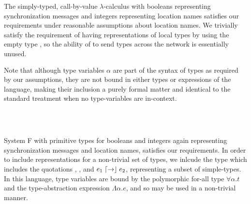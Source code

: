 \begin{ex}
  \label{ex:st-lambda}
  The simply-typed, call-by-value $\lambda$-calculus with booleans representing synchronization messages and integers representing location names satisfies our requirements under reasonable assumptions about location names.
  We trivially satisfy the requirement of having representations of local types by using the empty type \Empty, so the ability of \langname to send types across the network is essentially unused.

  Note that although type variables $\alpha$ are part of the syntax of types as required by our assumptions, they are not bound in either types or expressions of the language, making their inclusion a purely formal matter and identical to the standard treatment when no type-variables are in-context.
  \begin{syntax}
  	 \alternative{\alpha} \alternative{\Int} \alternative{\Bool} \alternative{\Empty} 
       \\
     \\
    \alternative{\True} \alternative{\False} 
  \end{syntax}
\end{ex}

\begin{ex}[System F]
  \label{ex:system-f}
  System F with primitive types for booleans and integers again representing synchronization messages and location names, satisfies our requirements.
  In order to include representations for a non-trivial set of types, we inlcude the type \Typ which includes the quotations \say{\Int}, \say{\Bool}, and $e_1 \mathrel{\lceil\mathord{\to}\rfloor} e_2$, representing a subset of simple-types.
  In this language, type variables are bound by the polymorphic for-all type $\forall \alpha.t$ and the type-abstraction expression $\Lambda \alpha.e$, and so may be used in a non-trivial manner.
  \begin{syntax}
  	 \alternative{\alpha} \alternative{\Int} \alternative{\Bool} \alternative{\Typ}\\
  	 
         \\
     \\
    \alternative{\True} \alternative{\False} \\
    \alternative{\say{\Int}} \alternative{\say{\Bool}} 
  \end{syntax}
\end{ex}

